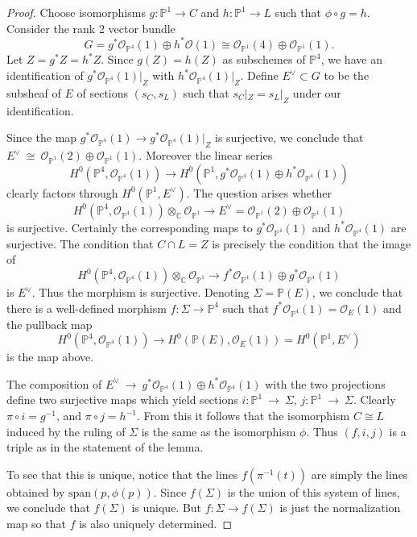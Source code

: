 \documentclass[twoside,12pt,reqno]{amsart}
\theoremstyle{plain}
\theoremstyle{definition}
\newcommand{\CC}{\mathbb{C}}
\newcommand{\PP}{\mathbb{P}}
\def\ps{\vspace{4pt}}
\newcommand{\OO}{\mathcal O}
\begin{document}
\begin{proof}
Choose isomorphisms $g:\PP^1\rightarrow C$ and $h:\PP^1\rightarrow L$
such that $\phi\circ g = h$.  Consider the rank 2 vector bundle
\begin{equation}
G=g^*\OO_{\PP^4}(1) \oplus h^*\OO(1) \cong
\OO_{\PP^1}(4)\oplus\OO_{\PP^1}(1). 
\end{equation}
Let $Z=g^*Z = h^*Z$.  Since $g(Z)=h(Z)$ as subschemes of $\PP^4$, we
have an identification of $g^*\OO_{\PP^4}(1)|_Z$ with
$h^*\OO_{\PP^4}(1)|_Z$.  Define $E^\vee\subset G$ to be the subsheaf
of $E$ of sections $(s_C,s_L)$ such that $s_C|_Z=s_L|_Z$ under our
identification. 

\ps

Since the map $g^*\OO_{\PP^4}(1) \rightarrow g^{*}\OO_{\PP^4}(1)|_Z$ 
is surjective, we conclude that
$E^\vee~\cong~\OO_{\PP^1}(2)\oplus\OO_{\PP^1}(1)$.  Moreover the
linear series 
\begin{equation}
H^0(\PP^4,\OO_{\PP^4}(1))\rightarrow H^0(\PP^1,g^*\OO_{\PP^4}(1)\oplus
h^*\OO_{\PP^4}(1)) 
\end{equation}
clearly factors through $H^0(\PP^1,E^\vee)$.  The question arises
whether 
\begin{equation}
H^0(\PP^4,\OO_{\PP^4}(1))\otimes_\CC \OO_{\PP^1}\rightarrow
E^\vee = \OO_{\PP^1}(2)\oplus\OO_{\PP^1}(1)
\end{equation}
is surjective.  Certainly the corresponding maps to
$g^*\OO_{\PP^4}(1)$ and $h^*\OO_{\PP^4}(1)$ are surjective.  The
condition that $C\cap L = Z$ is precisely the condition that the image
of 
\begin{equation}
H^0(\PP^4,\OO_{\PP^4}(1))\otimes_\CC \OO_{\PP^1}\rightarrow
f^*\OO_{\PP^4}(1)\oplus g^*\OO_{\PP^4}(1)
\end{equation}
is $E^\vee$.  Thus the morphism is surjective.  Denoting $\Sigma=\PP(E)$,
we conclude that there is a well-defined morphism
$f:\Sigma\rightarrow \PP^4$ such that $f^*\OO_{\PP^4}(1)=\OO_{E}
(1)$ and the pullback map
\begin{equation}
H^0(\PP^4,\OO_{\PP^4}(1))\rightarrow H^0(\PP(E),\OO_{E}
(1))=H^0(\PP^1,E^\vee)
\end{equation}
is the map above.  

\ps

The composition of $E^\vee~\rightarrow~g^*\OO_{\PP^4}(1)\oplus
h^*\OO_{\PP^4}(1)$ with the two projections define two surjective maps
which yield sections $i:\PP^1~\rightarrow~ \Sigma$,
$j:\PP^1~\rightarrow~\Sigma$.  Clearly $\pi\circ i = g^{-1}$, and 
$\pi\circ j=h^{-1}$.
From this it follows that the isomorphism $C\cong L$ induced by the ruling
of $\Sigma$ is the same as the isomorphism $\phi$.  Thus $(f,i,j)$ is a 
triple as in the statement of the lemma.  

\ps

To see that this is unique, notice that the lines $f(\pi^{-1}(t))$ are simply
the lines obtained by $\text{span}(p,\phi(p))$.  Since $f(\Sigma)$ is
the union of this system of lines, we conclude that $f(\Sigma)$ is
unique.  But $f:\Sigma\rightarrow f(\Sigma)$ is just the normalization map
so that $f$ is also uniquely determined.
\end{proof}
\end{document}

